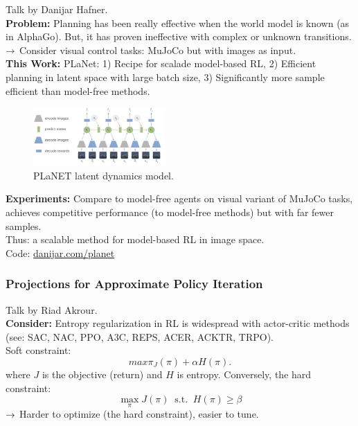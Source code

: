 Talk by Danijar Hafner. \\

{\bf Problem:} Planning has been really effective when the world model is known (as in AlphaGo). But, it has proven ineffective with complex or unknown transitions. \\

$\rightarrow$ Consider visual control tasks: MuJoCo but with images as input. \\

{\bf This Work:} PLaNet: 1) Recipe for scalade model-based RL, 2) Efficient planning in latent space with large batch size, 3) Significantly more sample efficient than model-free methods. \\

\begin{figure}
    \centering
    \includegraphics[width=0.45\textwidth]{images/planet.jpg}
    \caption{PLaNET latent dynamics model.}
    \label{fig:planet}
\end{figure}

{\bf Experiments:} Compare to model-free agents on visual variant of MuJoCo tasks, achieves competitive performance (to model-free methods) but with far fewer samples. \\

Thus: a scalable method for model-based RL in image space. \\

Code: \url{danijar.com/planet}

\spacerule

\subsubsection{Projections for Approximate Policy Iteration~\cite{akrour2019projections}}

Talk by Riad Akrour. \\

{\bf Consider:} Entropy regularization in RL is widespread with actor-critic methods (see: SAC, NAC, PPO, A3C, REPS, ACER, ACKTR, TRPO). \\

Soft constraint:
\[
max\pi_ J(\pi) + \alpha H(\pi).
\]
where $J$ is the objective (return) and $H$ is entropy. Conversely, the hard constraint:
\[
\max_\pi J(\pi)\ \text{ s.t. }\ H(\pi) \geq \beta
\]
$\rightarrow$ Harder to optimize (the hard constraint), easier to tune.

